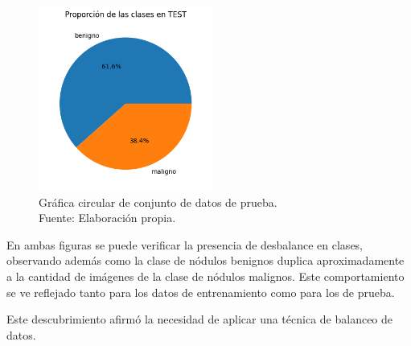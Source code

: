 \begin{figure}[H]
	\begin{center}
		\includegraphics[width=0.51\textwidth]{4/figures/test_circular.png}
		\caption[Gráfica circular de conjunto de datos de prueba]{Gráfica circular de conjunto de datos de prueba. \\
		Fuente: Elaboración propia.}
		\label{4:fig107}
	\end{center}
\end{figure}

En ambas figuras se puede verificar la presencia de desbalance en clases, observando además como la clase de nódulos benignos duplica aproximadamente a la cantidad de imágenes de la clase de nódulos malignos. Este comportamiento se ve reflejado tanto para los datos de entrenamiento como para los de prueba.

Este descubrimiento afirmó la necesidad de aplicar una técnica de balanceo de datos.

